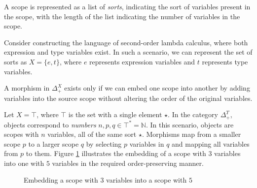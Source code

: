 \documentclass[runningheads]{llncs}
\begin{document}
A scope is represented as a list of \emph{sorts}, indicating the sort of variables present in the scope, with the length of the list indicating the number of variables in the scope.

\begin{example}
  Consider constructing the language of second-order lambda calculus, where both expression and type variables exist.
  In such a scenario, we can represent the set of sorts as $X = \{e, t\}$, where $e$ represents expression variables and $t$ represents type variables.
\end{example}

A morphism in $Δ_+^X$ exists only if we can embed one scope into another by adding variables into the source scope without altering the order of the original variables.
\begin{example}
  Let $X = ⊤$, where $⊤$ is the set with a single element $⋆$. In the category $Δ_+^T$, objects correspond to \emph{numbers} $n, p, q ∈ ⊤^* = ℕ$.
  In this scenario, objects are scopes with $n$ variables, all of the same sort $⋆$.
  Morphisms map from a smaller scope $p$ to a larger scope $q$ by selecting $p$ variables in $q$ and mapping all variables from $p$ to them.
  Figure \ref{fig:ex1} illustrates the embedding of a scope with $3$ variables into one with $5$ variables in the required order-preserving manner.
  \begin{figure}[]
    \centering
    \caption{Embedding a scope with $3$ variables into a scope with $5$}
    \label{fig:ex1}
  \end{figure}
\end{example}
\end{document}
